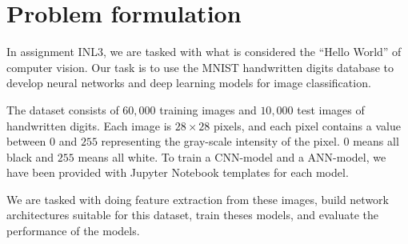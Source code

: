 \section{Problem formulation}

In assignment INL3, we are tasked with what is considered the ``Hello World'' of computer vision. Our task is to use the MNIST handwritten digits database to develop neural networks and deep learning models for image classification. 
\par
The dataset consists of $60,000$ training images and $10,000$ test images of handwritten digits. Each image is $28 \times 28$ pixels, and each pixel contains a value between $0$ and $255$ representing the gray-scale intensity of the pixel. $0$ means all black and $255$ means all white. To train a CNN-model and a ANN-model, we have been provided with Jupyter Notebook templates for each model. 
\par
We are tasked with doing feature extraction from these images, build network architectures suitable for this dataset, train theses models, and evaluate the performance of the models.  